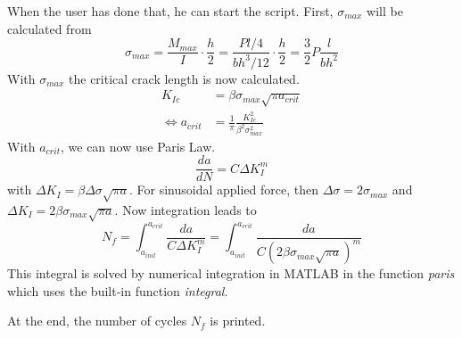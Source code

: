 \documentclass{article}
\begin{document}
When the user has done that, he can start the script. First, $\sigma_{max}$ will be calculated from $$\sigma_{max}=\frac{M_{max}}{I}\cdot \frac{h}{2}=\frac{Pl/4}{bh^3/12}\cdot \frac{h}{2}=\frac{3}{2}P\frac{l}{bh^2}$$
With $\sigma_{max}$ the critical crack length is now calculated.
\begin{align}
K_{Ic}&=\beta\sigma_{max}\sqrt{\pi a_{crit}} \\
\Leftrightarrow a_{crit} &=\frac{1}{\pi}\frac{K^2_{Ic}}{\beta^2 \sigma^2_{max}}
\end{align}
With $a_{crit}$, we can now use Paris Law.
$$\frac{da}{dN}=C\Delta K_I^m$$
with $\Delta K_I = \beta \Delta \sigma \sqrt{\pi a}$. For sinusoidal applied force, then $\Delta \sigma = 2\sigma_{max}$ and $\Delta K_I = 2 \beta \sigma_{max} \sqrt{\pi a}$.
Now integration leads to 
$$N_f=\int_{a_{init}}^{a_{crit}}\frac{da}{C\Delta K_I^m}=\int_{a_{init}}^{a_{crit}}\frac{da}{C(2 \beta \sigma_{max} \sqrt{\pi a})^m}$$
This integral is solved by numerical integration in MATLAB in the function \textit{paris} which uses the built-in function \textit{integral}.

At the end, the number of cycles $N_f$ is printed.
\end{document}
